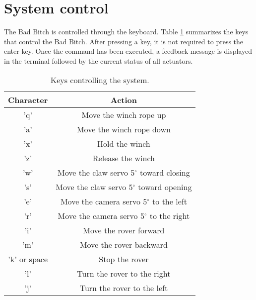 \documentclass[letterpaper, 12 pt]{article}
\begin{document}
\section{System control}
The Bad Bitch is controlled through the keyboard. Table \ref{tab:keys} summarizes the keys that control the Bad Bitch. After pressing a key, it is not required to press the enter key. Once the command has been executed, a feedback message is displayed in the terminal followed by the current status of all actuators.
\begin{table}[h]
\begin{center}
\caption{Keys controlling the system.}
\label{tab:keys}
\vspace{0.5cm}
\begin{tabular}{|c|c|}
\hline
\textbf{Character} & \textbf{Action}\\
\hline
'q' & Move the winch rope up\\
\hline
'a' & Move the winch rope down\\
\hline
'x' & Hold the winch\\
\hline
'z' & Release the winch\\
\hline 
'w' & Move the claw servo 5$^{\circ}$ toward closing\\
\hline  
's' & Move the claw servo 5$^{\circ}$ toward opening\\
\hline
'e' & Move the camera servo 5$^{\circ}$ to the left\\
\hline  
'r' & Move the camera servo 5$^{\circ}$ to the right\\
\hline
'i' & Move the rover forward\\
\hline
'm' & Move the rover backward\\
\hline
'k' or space & Stop the rover\\
\hline
'l' & Turn the rover to the right\\
\hline
'j' & Turn the rover to the left\\
\hline

\end{tabular}
\end{center}
\end{table}
%

\end{document}
